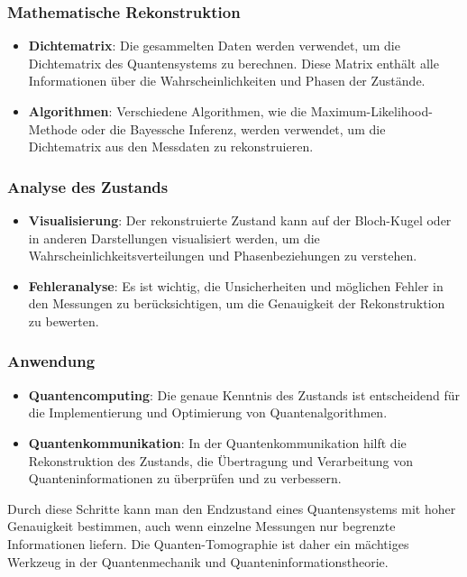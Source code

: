 \documentclass[12pt,a4paper]{article}
\begin{document}
	\subsubsection{Mathematische Rekonstruktion}
	\begin{itemize}
		\item \textbf{Dichtematrix}: Die gesammelten Daten werden verwendet, um die Dichtematrix des Quantensystems zu berechnen. Diese Matrix enthält alle Informationen über die Wahrscheinlichkeiten und Phasen der Zustände.
		\item \textbf{Algorithmen}: Verschiedene Algorithmen, wie die Maximum-Likelihood-Methode oder die Bayessche Inferenz, werden verwendet, um die Dichtematrix aus den Messdaten zu rekonstruieren.
	\end{itemize}
	
	\subsubsection{Analyse des Zustands}
	\begin{itemize}
		\item \textbf{Visualisierung}: Der rekonstruierte Zustand kann auf der Bloch-Kugel oder in anderen Darstellungen visualisiert werden, um die Wahrscheinlichkeitsverteilungen und Phasenbeziehungen zu verstehen.
		\item \textbf{Fehleranalyse}: Es ist wichtig, die Unsicherheiten und möglichen Fehler in den Messungen zu berücksichtigen, um die Genauigkeit der Rekonstruktion zu bewerten.
	\end{itemize}
	
	\subsubsection{Anwendung}
	\begin{itemize}
		\item \textbf{Quantencomputing}: Die genaue Kenntnis des Zustands ist entscheidend für die Implementierung und Optimierung von Quantenalgorithmen.
		\item \textbf{Quantenkommunikation}: In der Quantenkommunikation hilft die Rekonstruktion des Zustands, die Übertragung und Verarbeitung von Quanteninformationen zu überprüfen und zu verbessern.
	\end{itemize}
	
	Durch diese Schritte kann man den Endzustand eines Quantensystems mit hoher Genauigkeit bestimmen, auch wenn einzelne Messungen nur begrenzte Informationen liefern. Die Quanten-Tomographie ist daher ein mächtiges Werkzeug in der Quantenmechanik und Quanteninformationstheorie.
	
\end{document}
